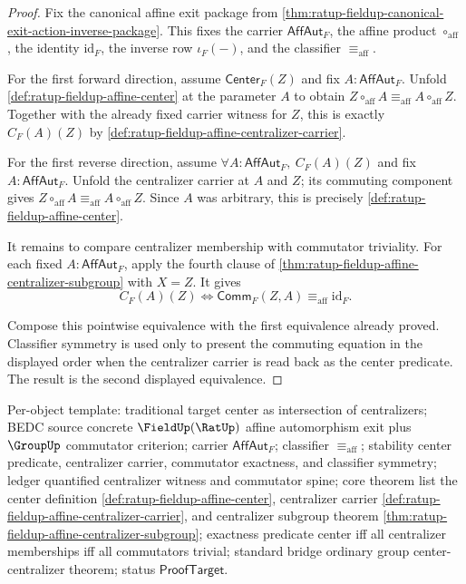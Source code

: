 \begin{proof}
Fix the canonical affine exit package from
\autoref{thm:ratup-fieldup-canonical-exit-action-inverse-package}. This fixes
the carrier $\mathsf{AffAut}_F$, the affine product $\circ_{\mathrm{aff}}$,
the identity $\mathrm{id}_F$, the inverse row $\iota_F(-)$, and the classifier
$\equiv_{\mathrm{aff}}$.

For the first forward direction, assume $\mathsf{Center}_F(Z)$ and fix
$A:\mathsf{AffAut}_F$. Unfold
\autoref{def:ratup-fieldup-affine-center} at the parameter $A$ to obtain
$Z\circ_{\mathrm{aff}}A\equiv_{\mathrm{aff}}A\circ_{\mathrm{aff}}Z$.
Together with the already fixed carrier witness for $Z$, this is exactly
$C_F(A)(Z)$ by \autoref{def:ratup-fieldup-affine-centralizer-carrier}.

For the first reverse direction, assume
$\forall A:\mathsf{AffAut}_F,\ C_F(A)(Z)$ and fix
$A:\mathsf{AffAut}_F$. Unfold the centralizer carrier at $A$ and $Z$; its
commuting component gives
$Z\circ_{\mathrm{aff}}A\equiv_{\mathrm{aff}}A\circ_{\mathrm{aff}}Z$.
Since $A$ was arbitrary, this is precisely
\autoref{def:ratup-fieldup-affine-center}.

It remains to compare centralizer membership with commutator triviality. For
each fixed $A:\mathsf{AffAut}_F$, apply the fourth clause of
\autoref{thm:ratup-fieldup-affine-centralizer-subgroup} with $X=Z$.
It gives
$$
C_F(A)(Z)
\Longleftrightarrow
\mathsf{Comm}_F(Z,A)\equiv_{\mathrm{aff}}\mathrm{id}_F.
$$

Compose this pointwise equivalence with the first equivalence already proved.
Classifier symmetry is used only to present the commuting equation in the
displayed order when the centralizer carrier is read back as the center
predicate. The result is the second displayed equivalence.
\end{proof}

Per-object template: traditional target center as intersection of
centralizers; BEDC source concrete $\FieldUp(\RatUp)$ affine automorphism exit
plus $\GroupUp$ commutator criterion; carrier $\mathsf{AffAut}_F$; classifier
$\equiv_{\mathrm{aff}}$; stability center predicate, centralizer carrier,
commutator exactness, and classifier symmetry; ledger quantified centralizer
witness and commutator spine; core theorem list the center definition
\autoref{def:ratup-fieldup-affine-center}, centralizer carrier
\autoref{def:ratup-fieldup-affine-centralizer-carrier}, and centralizer
subgroup theorem \autoref{thm:ratup-fieldup-affine-centralizer-subgroup};
exactness predicate center iff all centralizer memberships iff all
commutators trivial; standard bridge ordinary group center-centralizer
theorem; status $\mathsf{ProofTarget}$.

